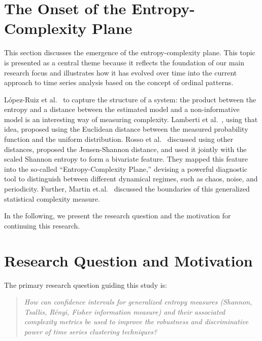 

\section{The Onset of the Entropy-Complexity Plane}\label{Sec:Onset}

This section discusses the emergence of the entropy-complexity plane. This topic is presented as a central theme because it reflects the foundation of our main research focus and illustrates how it has evolved over time into the current approach to time series analysis based on the concept of ordinal patterns. 

López-Ruiz et al.~\cite{lopez1995statistical} to capture the structure of a system:
the product between the entropy and a distance between the estimated model and a non-informative model is an interesting way of measuring complexity.
Lamberti et al.~\cite{lamberti2004intensive}, using that idea, proposed using the Euclidean distance between the measured probability function and the uniform distribution.
Rosso et al.~\cite{EEGAnalysisUsingWaveletBasedInformationTools} discussed using other distances, proposed the Jensen-Shannon distance, and used it jointly with the scaled Shannon entropy to form a bivariate feature.
They mapped this feature into the so-called ``Entropy-Complexity Plane,'' devising  a powerful diagnostic tool to distinguish between different dynamical regimes, such as chaos, noise, and periodicity.
Further, Martin et.al.~\cite{Martin2006} discussed the boundaries of this generalized statistical complexity measure. 

In the following, we present the research question and the motivation for continuing this research. 

\section{Research Question and Motivation}\label{Sec:ResearchQuestion}

The primary research question guiding this study is:
\begin{quote}
	\textit{How can confidence intervals for generalized entropy measures (Shannon, Tsallis, Rényi, Fisher information measure) and their associated complexity metrics be used to improve the robustness and discriminative power of time series clustering techniques?}
\end{quote}

